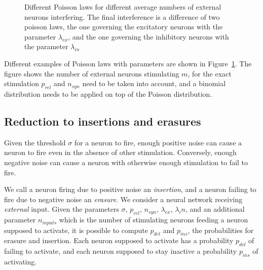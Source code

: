 \documentclass[journal]{IEEEtran}
\begin{document}
\begin{figure}
\caption{Different Poisson laws for different average numbers of external neurons interfering. The final interference is a difference of two poisson laws, the one governing the excitatory neurons with the parameter $\lambda_{ex}$, and the one governing the inhibitory neurons with the parameter $\lambda_{in}$}
\label{fig:poisson}
\end{figure}

Different examples of Poisson laws with parameters are shown in Figure~\ref{fig:poisson}. The figure shows the number of external neurons stimulating $m$, for the exact stimulation $p_{rel}$ and $n_{syn}$ need to be taken into account, and a binomial distribution needs to be applied on top of the Poisson distribution.

\subsection{Reduction to insertions and erasures}

Given the threshold $\sigma$ for a neuron to fire, enough positive noise can cause a neuron to fire even in the absence of other stimulation. Conversely, enough negative noise can cause a neuron with otherwise enough stimulation to fail to fire.

We call a neuron firing due to positive noise an \emph{insertion}, and a neuron failing to fire due to negative noise an \emph{erasure}. We consider a neural network receiving \emph{external} input. Given the parameters $\sigma$, $p_{rel}$, $n_{syn}$, $\lambda_{ex}$, $\lambda_in$, and an additional parameter $n_{inputs}$ which is the number of stimulating neurons feeding a neuron supposed to activate, it is possible to compute $p_{del}$ and $p_{ins}$, the probabilities for erasure and insertion. Each neuron supposed to activate has a probability $p_{del}$ of failing to activate, and each neuron supposed to stay inactive a probability $p_{ins}$ of activating.
\end{document}
